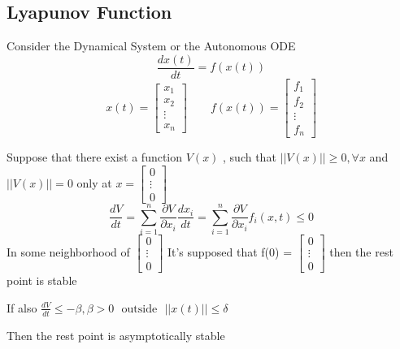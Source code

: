 \subsection{Lyapunov Function}
Consider the Dynamical System or the Autonomous ODE
\[
    \frac{dx(t)}{dt} = f(x(t))
\]
\[
    x(t) = \begin{bmatrix}
        x_{1}  \\
        x_{2}  \\
        \vdots \\
        x_{n}
    \end{bmatrix}
    \qquad
    f(x(t)) = \begin{bmatrix}
        f_{1}  \\
        f_{2}  \\
        \vdots \\
        f_{n}
    \end{bmatrix}
\]
\begin{theorem}
    Suppose that there exist a function $V(x)$ , such that $||V(x)|| \geq 0 , \forall x$ and $||V(x)|| = 0$ only at $x = \begin{bmatrix}
            0      \\
            \vdots \\
            0
        \end{bmatrix}$
    \[
        \frac{dV}{dt} = \sum_{i=1}^{n} \frac{\partial V}{\partial x_i}\frac{d x_i}{dt}
        = \sum_{i=1}^{n} \frac{\partial V}{\partial x_i} f_i(x,t) \leq 0
    \]
    In some neighborhood of $\begin{bmatrix}
            0      \\
            \vdots \\
            0
        \end{bmatrix}$
    It's supposed that f(0) = $\begin{bmatrix}
            0      \\
            \vdots \\
            0
        \end{bmatrix}$ then the rest point is stable

    If also $\displaystyle \frac{dV}{dt} \leq -\beta ,  \beta > 0 \ \ \ \text{outside} \ \ \ ||x(t)|| \leq \delta $

    Then the rest point is asymptotically stable
\end{theorem}
